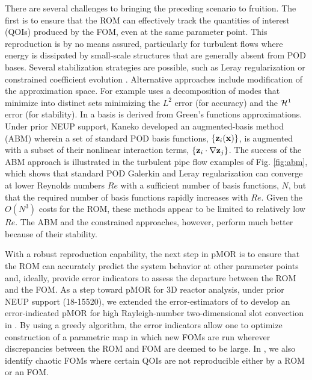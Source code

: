 There are several challenges to bringing the preceding scenario to fruition.
The first is to ensure that the ROM can effectively track the quantities
of interest (QOIs) produced by the FOM, even at the same parameter point.
This reproduction is by no means assured, particularly for turbulent flows
where energy is dissipated by small-scale structures that are generally absent
from POD bases.  Several stabilization strategies are possible, such as Leray
regularization \cite{wang2012proper} or constrained coefficient evolution
\cite{fick18}.  Alternative approaches include modification of the approximation
space.  For example \cite{akkari19} uses a decomposition of modes that minimize
into distinct sets minimizing the $L^2$ error (for accuracy) and the ${\cal H}^1$
error (for stability).  In \cite{khodkar2019} a basis is derived from Green's
functions approximations.
   Under prior NEUP support, Kaneko \cite{kaneko22a,kaneko22} developed an
augmented-basis method (ABM) wherein a set of standard POD basis functions,
$\{{\bf z}_i({\bf x}) \}$,  is augmented with a subset of their nonlinear interaction
terms, $\{{\bf z}_i \cdot \nabla {\bf z}_j\}$.   
  The success of the ABM approach is illustrated in the turbulent pipe flow
examples of Fig. \ref{fig:abm}, which shows that standard POD Galerkin and
Leray regularization can converge at lower Reynolds numbers $Re$ with a
sufficient number of basis functions, $N$, but that the required number of
basis functions rapidly increases with $Re$.  Given the $O(N^3)$ costs for the
ROM, these methods appear to be limited to relatively low $Re$.  The ABM and
the constrained approaches, however, perform much better because of their
stability.

With a robust reproduction capability, the next step in pMOR is to ensure that
the ROM can accurately predict the system behavior at other parameter points
and, ideally, provide error indicators to assess the departure between the ROM
and the FOM.  As a step toward pMOR for 3D reactor analysis, under prior NEUP
support (18-15520),  we extended the error-estimators of \cite{fick18} to develop
an error-indicated pMOR for high Rayleigh-number two-dimensional slot
convection in \cite{tsai22a}. 
By using a greedy algorithm, the error indicators allow one to optimize
construction of a parametric map in which new FOMs are run wherever
discrepancies between the ROM and FOM are deemed to be large.
In \cite{tsai22a}, we also identify chaotic FOMs where certain QOIs are not
reproducible either by a ROM or an FOM.



